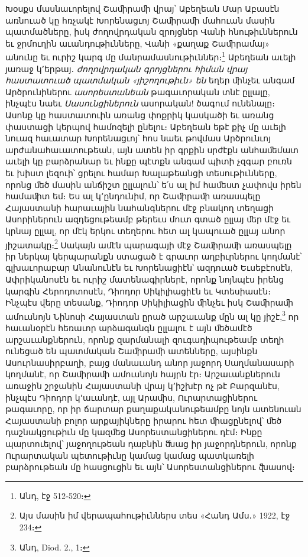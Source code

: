 \documentclass{article}
\begin{document}
{Խօսքս մասնաւորելով Շաﬕրաﬕ վրայ՝ Աբեղեան Մար Աբասէն առնուած կը հռչակէ Խորենացւոյ Շաﬕրաﬕ մահուան մասին պատմածները, իսկ ժողովրդական զրոյցներ Վանի հնութիւններուն եւ ջրմուղին աւանդութիւնները, Վանի «քաղաք Շաﬕրամայ» անունը եւ ուրիշ կարգ մը մանրամասնութիւններ։\footnote{Անդ, էջ 512֊520։} Աբեղեան աւելի յառաջ կ՚երթայ․ \emph{ժողովրդական գրոյցներու հիման վրայ հաստատուած պատմական «յիշողութիւն» են} եղեր ﬕնչեւ անգամ Արծրունիներու \emph{ասորեստանեան} թագաւորական տնէ ըլլալը, ինչպէս նաեւ \emph{Սասունցիներուն} ասորական! ծագում ունենալը։ Ասոնք կը հաստատուին առանց փոքրիկ կասկածի եւ առանց փաստացի կերպով համոզելի ընելու։ Աբեղեան եթէ քիչ մը աւելի նուազ հաւատար Խորենացւոյ՝ հոս նաեւ թովմաս Արծրունւոյ արժանահաւատութեան, այն ատեն իր գրքին սրժէքն անհաﬔմատ աւելի կը բարձրանար եւ ինքը պէտքն անգամ պիտի չզգար բուռն եւ խիստ լեզուի՝ ցրելու համար Խալաթեանցի տեսութիւնները, որոնց ﬔծ մասին անճիշտ ըլլալուն՝ ե՛ս ալ իմ հաﬔստ չափովս իրեն համաﬕտ եմ։ Ես ալ կ՚ընդունիմ, որ Շաﬕրաﬕ առասպելը Հայաստանի հարաւային նահանգներու մէջ բնակող տեղացի Ասորիներուն ազդեցութեամբ թերեւս մուտ գտած ըլլայ ﬔր մէջ եւ կրնայ ըլլալ, որ մէկ երկու տեղերու հետ ալ կապուած ըլլայ անոր յիշատակը։\footnote{Այս մասին իմ վերապահութիւններս տես «Հանդ Ամս․» 1922, էջ 234։} Սակայն ամէն պարագայի մէջ Շաﬕրաﬕ առասպելը իր ներկայ կերպարանքն ստացած է գրաւոր աղբիւրներու կողմանէ՝ գլխաւորաբար Անանունէն եւ Խորենացիէն՝ ազդուած Եւսեբէոսէն, Ափրիկանոսէն եւ ուրիշ մատենագիրներէ, որոնք նոյնպէս իրենց կարգին Հերոդոտոսէն, Դիոդոր Սիկիլիացիէն եւ Կտեսիասէն։ Ինչպէս վերը տեսանք, Դիոդոր Սիկիլիացին ﬕնչեւ իսկ Շաﬕրաﬕ ամուսնոյն Նինոսի Հայաստան ըրած արշաւանք մըն ալ կը յիշէ,\footnote{Անդ, Diod. 2., 1։} որ հաւանօրէն հեռաւոր արձագանգն ըլլալու է այն ﬔծամէծ արշաւանքներուն, որոնք զարմանալի զուգադիպութեամբ տեղի ունեցած են պատմական Շաﬕրաﬕ ատենները, այսինքն Ասուրնասիրբաղի, բայց մանաւանդ անոր յաջորդ Սաղմանասարի կողմանէ, որ Շաﬕրաﬕ ամուսնոյն հայրն էր։ Արշաւանքներուն առաջին շրջանին Հայաստանի վրայ կ՚իշխէր ոչ թէ Բարզանէս, ինչպէս Դիոդոր կ՚աւանդէ, այլ Արաﬕս, Ուրարտացիներու թագաւորը, որ իր ճարտար քաղաքականութեամբը նոյն ատենուան Հայաստանի բոլոր արքայիկները իրարու հետ ﬕացընելով՝ ﬔծ դաշնակցութիւն մը կազﬔց Ասորեստանցիներու դէմ։ Ինքը պարտուելով՝ յաջողութեան դաբնին ﬓաց իր յաջորդներուն, որոնք Ուրարտական պետութիւնը կամաց կամաց պատկառելի բարձրութեան մը հասցուցին եւ այն՝ Ասորեստանցիներու ﬖասով։

}
\end{document}
